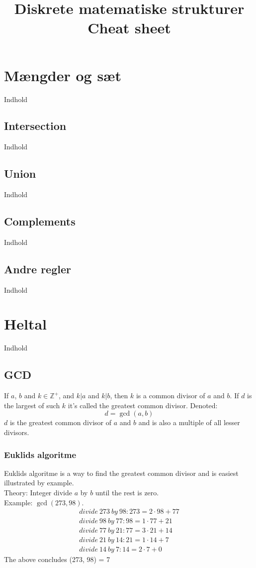 \documentclass[a4paper]{article}
\title{Diskrete matematiske strukturer\\
          Cheat sheet}
\author {}
\date{}
\newcommand{\Integers}{\mathbb{Z}}
\begin{document}
\maketitle
\tableofcontents
\clearpage
\section{Mængder og sæt}
  Indhold
  \subsection{Intersection}
    Indhold
  \subsection{Union}
    Indhold
  \subsection{Complements}
    Indhold
  \subsection{Andre regler}
    Indhold
\section{Heltal}
  Indhold
  \subsection{GCD}
    If $a$, $b$ and $k \in \Integers^+$, and $k | a$ and $k | b$, then $k$ is a common divisor of $a$ and $b$. If $d$ is the largest of such $k$ it's called the greatest common divisor. Denoted:
    $$d = \operatorname{gcd}(a, b)$$
    $d$ is the greatest common divisor of $a$ and $b$ and is also a multiple of all lesser divisors.
    \subsubsection{Euklids algoritme}
     Euklids algoritme is a way to find the greatest common divisor and is easiest illustrated by example.\\
     Theory: Integer divide $a$ by $b$ until the rest is zero.\\
     Example: $\operatorname{gcd}(273, 98)$.%
     \begin{eqnarray}
      divide\ 273\ by\ 98:	273 = 2 \cdot 98 + 77\\
      divide\ 98\ by\ 77:	98 = 1 \cdot 77 + 21\\
      divide\ 77\ by\ 21:	77 = 3 \cdot 21 + 14\\
      divide\ 21\ by\ 14:	21 = 1 \cdot 14 + 7\\
      divide\ 14\ by\ 7:	14 = 2 \cdot 7 + 0
     \end{eqnarray}
     The above concludes (273, 98) = 7
\end{document}
